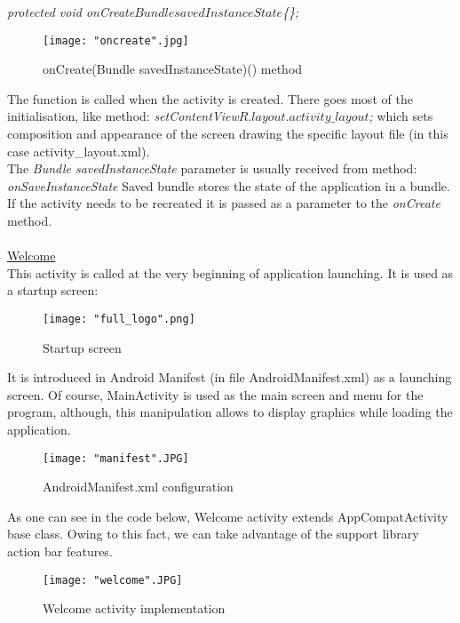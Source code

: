 \documentclass[12pt]{article}
\begin{document}
\centerline{\textit{protected void onCreate\(Bundle savedInstanceState\)\{\};}}

\begin{figure}[H]
\centerline{\texttt{[image: "oncreate".jpg]}}
\caption{onCreate(Bundle savedInstanceState)() method}
\label{fig:onCreate}
\end{figure}

The function is called when the activity is created. There goes most of the initialisation, like method:
\textit{setContentView\(R.layout.activity\_layout\);} 
which sets composition and appearance of the screen drawing the specific layout file (in this case activity\_layout.xml). \\
The \textit{Bundle savedInstanceState} parameter is usually received from method: 
\textit{onSaveInstanceState\(\)} 
Saved bundle stores the state of the application in a bundle. If the activity needs to be recreated it is passed as a parameter to the \textit{onCreate} method.
\cleardoublepage

\paragraph{}
\underline{Welcome}\\
This activity is called at the very beginning of application launching. It is used as a startup screen:
\begin{figure}[H]
\centerline{\texttt{[image: "full\_logo".png]}}
\caption{Startup screen}
\label{fig:fullLogo}
\end{figure}

It is introduced in Android Manifest (in file AndroidManifest.xml) as a launching screen. Of course, MainActivity is used as the main screen and menu for the program, although, this manipulation allows to display graphics while loading the application.

\begin{figure}[H]
\centerline{\texttt{[image: "manifest".JPG]}}
\caption{AndroidManifest.xml configuration}
\label{fig:manifest}
\end{figure}

As one can see in the code below, Welcome activity extends AppCompatActivity base class. Owing to this fact, we can take advantage of  the support library action bar features.

\begin{figure}[H]
\centerline{\texttt{[image: "welcome".JPG]}}
\caption{Welcome activity implementation}
\label{fig:welcome}
\end{figure}
\end{document}
